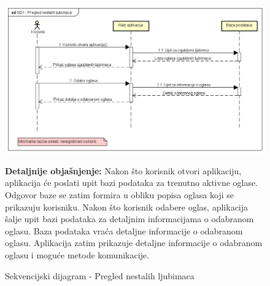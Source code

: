 \begin{figure}[hp!]
	\centering
	\includegraphics[width=\textwidth]{slike/SD1 - Pregled nestalih ljubimaca.png}
	\caption{Sekvencijski dijagram - Pregled nestalih ljubimaca}
	\begin{flushleft}
		\textbf{Detaljnije objašnjenje:}
		Nakon što korisnik otvori aplikaciju, aplikacija će poslati upit bazi podataka za trenutno aktivne oglase. Odgovor baze se zatim formira u obliku popisa oglasa koji se prikazuju korisniku. Nakon što korisnik odabere oglas, aplikacija šalje upit bazi podataka za detaljnim informacijama o odabranom oglasu. Baza podataka vraća detaljne informacije o odabranom oglasu. Aplikacija zatim prikazuje detaljne informacije o odabranom oglasu i moguće metode komunikacije.
	\end{flushleft}
\end{figure}
\pagebreak
